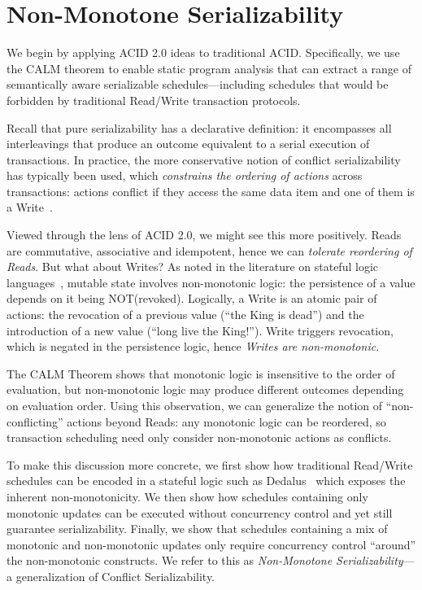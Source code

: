 \documentclass{sig-alternate}
\begin{document}
\section{Non-Monotone Serializability}
We begin by applying ACID 2.0 ideas to traditional ACID.  Specifically, we use the CALM theorem to enable static program analysis that can extract a range of semantically aware serializable schedules---including schedules that would be forbidden by traditional Read/Write transaction protocols.

Recall that pure serializability has a declarative definition: it encompasses all interleavings
that produce an outcome equivalent to a serial execution of transactions.  In
practice, the more conservative notion of conflict serializability has typically
been used, which \emph{constrains the ordering of actions} across transactions:
actions conflict if they access the same data item and one of them is a
Write~\cite{Eswaran1976}.  

Viewed through the lens of ACID 2.0, we might see this more positively.  Reads are commutative, associative and idempotent, hence we can \emph{tolerate reordering of Reads}.  But what about Writes? 
As noted in the literature on stateful logic languages~\cite{dedalus,statelog}, mutable state 
involves non-monotonic logic: the persistence of a value depends on it being
NOT(revoked). Logically, a Write is an atomic pair of actions: the revocation of a previous
value (``the King is dead'') and the introduction of a new value (``long live the King!''). 
Write triggers revocation, which is negated in the persistence logic, hence \emph{Writes are non-monotonic}.

The CALM Theorem shows that monotonic logic is insensitive to the order of evaluation, but non-monotonic logic may produce different outcomes depending on evaluation order.  Using this observation, we can generalize the notion of ``non-conflicting'' actions beyond Reads: any monotonic logic can be reordered, so transaction scheduling need only consider non-monotonic actions as conflicts.

To make this discussion more concrete, we first show how traditional Read/Write
schedules can be encoded in a stateful logic such as Dedalus~\cite{dedalus} which exposes 
the inherent non-monotonicity. We
then show how schedules containing only monotonic updates can be executed
without concurrency control and yet still guarantee serializability. Finally, we
show that schedules containing a mix of monotonic and non-monotonic updates only
require concurrency control ``around'' the non-monotonic constructs. We refer to
this as \emph{Non-Monotone Serializability}---a generalization of Conflict Serializability.
\end{document}
